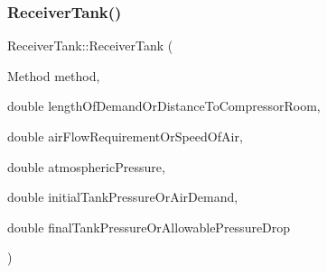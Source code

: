 \subsubsection{\texorpdfstring{Receiver\+Tank()}{ReceiverTank()}\hspace{0.1cm}{\footnotesize\ttfamily [8/9]}}
{\footnotesize\ttfamily Receiver\+Tank\+::\+Receiver\+Tank (\begin{DoxyParamCaption}\item[{Method}]{method,  }\item[{double}]{length\+Of\+Demand\+Or\+Distance\+To\+Compressor\+Room,  }\item[{double}]{air\+Flow\+Requirement\+Or\+Speed\+Of\+Air,  }\item[{double}]{atmospheric\+Pressure,  }\item[{double}]{initial\+Tank\+Pressure\+Or\+Air\+Demand,  }\item[{double}]{final\+Tank\+Pressure\+Or\+Allowable\+Pressure\+Drop }\end{DoxyParamCaption})}

